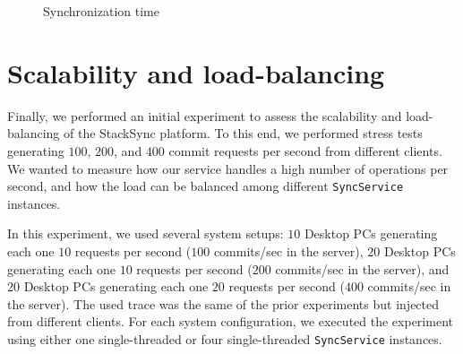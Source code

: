 \begin{figure}[t]
  \centering
	\caption{Synchronization time}
  \vspace{-5pt}
  \label{fig:synchronization_time}
\end{figure}


\section{Scalability and load-balancing}

Finally, we performed an initial experiment to assess the scalability and load-balancing of 
the StackSync platform. To this end, we performed stress tests generating $100$, $200$, and
$400$ commit requests per second from different clients. We wanted to measure how our service
handles a high number of operations per second, and how the load can be balanced among different
\texttt{SyncService} instances.

In this experiment, we used several system setups: $10$ Desktop PCs generating each one $10$ 
requests per second ($100$ commits/sec in the server), $20$ Desktop PCs generating each one
$10$ requests per second ($200$ commits/sec in the server), and $20$ Desktop PCs generating
each one $20$ requests per second ($400$ commits/sec in the server). 
The used trace was the same of the prior experiments but injected from different clients.
For each system configuration, we executed the experiment using either one single-threaded or four single-threaded 
\texttt{SyncService} instances. 

